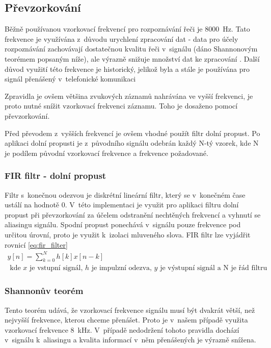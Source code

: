 \subsection{Převzorkování}
Běžně používanou vzorkovací frekvencí pro rozpoznávání řeči je 8000~Hz. Tato frekvence je využívána z~důvodu urychlení zpracování dat - data pro účely rozpoznávání zachovávají dostatečnou kvalitu řeči v~signálu (dáno Shannonovým teorémem popsaným níže), ale výrazně snižuje množství dat ke zpracování \cite{rabiner2011theory}. Další důvod využití této frekvence je historický, jelikož byla a stále je používána pro signál přenášený v~telefonické komunikaci

Zpravidla je ovšem většina zvukových záznamů nahrávána ve vyšší frekvenci, je proto nutné snížit vzorkovací frekvenci záznamu. Toho je dosaženo pomocí převzorkování.

Před převodem z~vyšších frekvencí je ovšem vhodné použít filtr dolní propust. Po aplikaci dolní propusti je z~původního signálu odebrán každý N-tý vzorek, kde N je podílem původní vzorkovací frekvence a frekvence požadované.
\subsubsection{FIR filtr - dolní propust}
Filtr s~konečnou odezvou je diskrétní lineární filtr, který se v~konečném čase ustálí na hodnotě 0. V~této implementaci je využit pro aplikaci filtru dolní propust při převzorkování za účelem odstranění nechtěných frekvencí a vyhnutí se aliasingu signálu. Spodní propust ponechává v~signálu pouze frekvence pod určitou úrovní, proto je využit k~izolaci mluveného slova. FIR filtr lze vyjádřit rovnicí \ref{eq:fir_filter}
\begin{equation} \label{eq:fir_filter}
\begin{gathered}
y[n] = \sum^{N}_{k=0}{h[k]x[n-k]}\\
\text{ kde $x$ je vstupní signál, $h$ je impulzní odezva, $y$ je výstupní signál a N je řád filtru}
\end{gathered}
\end{equation}

\subsubsection{Shannonův teorém}
Tento teorém udává, že vzorkovací frekvence signálu musí být dvakrát větší, než nejvyšší frekvence, kterou chceme přenášet. Proto je v~našem případě využita vzorkovací frekvence 8~kHz. V~případě nedodržení tohoto pravidla dochází v~signálu k~aliasingu a kvalita informací v~něm přenášených je výrazně snížena.

